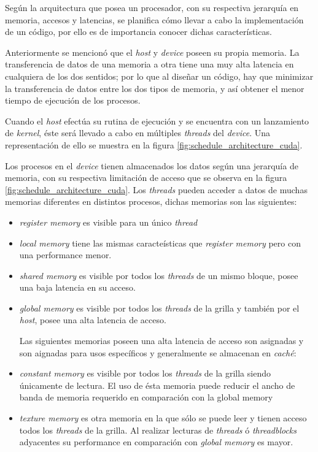 Según la arquitectura que posea un procesador, con su respectiva jerarquía en memoria, accesos y latencias, se planifica cómo llevar a cabo la implementación de un código, por ello es de importancia conocer dichas características. 

Anteriormente se mencionó que el \textit{host} y \textit{device} poseen su propia memoria. La transferencia de datos de una memoria a otra tiene una muy alta latencia en cualquiera de los dos sentidos; por lo que al diseñar un código, hay que minimizar la transferencia de datos entre los dos tipos de memoria, y así obtener el menor tiempo de ejecución de los procesos.

Cuando el \textit{host} efectúa su rutina de ejecución y se encuentra con un lanzamiento de \textit{kernel}, éste será llevado a cabo en múltiples \textit{threads} del \textit{device}. Una representación de ello se muestra en la figura \ref{fig:schedule_architecture_cuda}. 

Los procesos en el \textit{device} tienen almacenados los datos según una jerarquía de memoria, con su respectiva limitación de acceso que se observa en la figura \ref{fig:schedule_architecture_cuda}. Los \textit{threads} pueden acceder a datos de muchas memorias diferentes en distintos procesos, dichas memorias son las siguientes:

\begin{itemize}
	\item  \textit{register memory} es visible para un único \textit{thread}
	\item \textit{local memory} tiene las mismas caracteísticas que \textit{register memory} pero con una performance menor.
	\item \textit{shared memory} es visible por todos los \textit{threads} de un mismo bloque, posee una baja latencia en su acceso.
	\item \textit{global memory} es visible por todos los \textit{threads} de la grilla y también por el \textit{host}, posee una alta latencia de acceso.
	
	Las siguientes memorias poseen una alta latencia de acceso son asignadas y son aignadas para usos específicos y generalmente se almacenan en \textit{caché}:
	
	\item \textit{constant memory} es visible por todos los \textit{threads} de la grilla siendo únicamente de lectura. El uso de ésta memoria puede reducir el ancho de banda de memoria requerido en comparación con la {global memory}
	\item \textit{texture memory} es otra memoria en la que sólo se puede leer y tienen acceso todos los \textit{threads} de la grilla. Al realizar lecturas de \textit{threads} ó \textit{threadblocks} adyacentes su performance en comparación con \textit{global memory} es mayor. 
	
\end{itemize}


